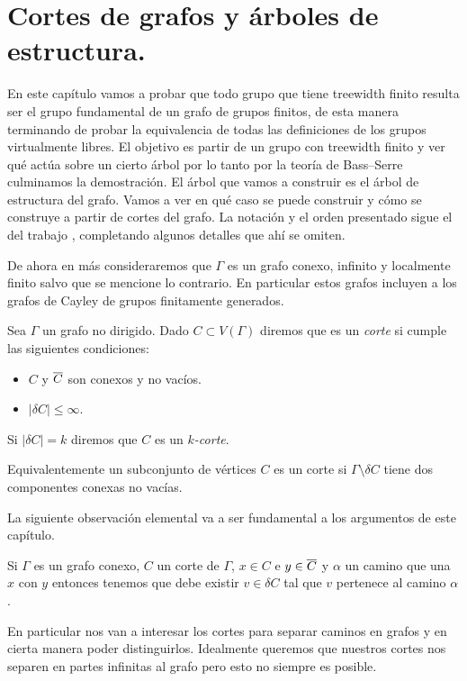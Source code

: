 \documentclass[tesis.tex]{subfiles}
\begin{document}
	
\chapter{Cortes de grafos y árboles de estructura.}

En este capítulo vamos a probar que todo grupo que tiene treewidth finito resulta ser el grupo fundamental de un grafo de grupos finitos, de esta manera terminando de probar la equivalencia de todas las definiciones de los grupos virtualmente libres.
El objetivo es partir de un grupo con treewidth finito y ver qué actúa sobre un cierto árbol por lo tanto por la teoría de Bass--Serre culminamos la demostración.
El árbol que vamos a construir es el árbol de estructura del grafo.
Vamos a ver en qué caso se puede construir y cómo se construye a partir de cortes del grafo. 
La notación y el orden presentado sigue el del trabajo \cite{diekert2013context}, completando algunos detalles que ahí se omiten.

De ahora en más consideraremos que $\Gamma$ es un grafo conexo, infinito y localmente finito salvo que se mencione lo contrario.
En particular estos grafos incluyen a los grafos de Cayley de grupos finitamente generados.
\begin{deff}
	Sea $\Gamma$ un grafo no dirigido.
	Dado $C \subset V(\Gamma)$ diremos que es un \emph{corte} si cumple las siguientes condiciones:
	\begin{itemize}
		\item $C$ y $\overline C$ son conexos y no vacíos.
		\item $|\delta C| \le \infty$.
	\end{itemize}
	Si $|\delta C| = k$ diremos que $C$ es un \emph{$k$-corte}.
\end{deff}	
Equivalentemente un subconjunto de vértices $C$ es un corte si $\Gamma \setminus \delta C$ tiene dos componentes conexas no vacías.


La siguiente observación elemental va a ser fundamental a los argumentos de este capítulo.

\begin{obs}\label{obs_camino_corte}
	Si $\Gamma$ es un grafo conexo, $C$ un corte de $\Gamma$, $x \in C$ e $y \in \overline C$ y 
	$\alpha$ un camino que una $x$ con $y$ 
	entonces tenemos que debe existir $v \in \delta C$ tal que $v$ pertenece al camino $\alpha$.
\end{obs} 


En particular nos van a interesar los cortes para separar caminos en grafos y en cierta manera poder distinguirlos.
Idealmente queremos que nuestros cortes nos separen en partes infinitas al grafo pero esto no siempre es posible.
\end{document}
